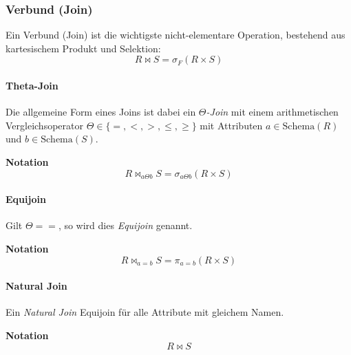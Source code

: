 \documentclass[a4paper, 11pt, accentcolor = tud3b]{tudreport}
\newcommand{\Schema}{\text{Schema}}
\begin{document}
                \subsubsection{Verbund (Join)} %
                    Ein Verbund (Join) ist die wichtigste nicht-elementare Operation, bestehend aus kartesischem Produkt und Selektion:
                    \begin{equation*}
	                    R \bowtie S = \sigma_F(R \times S)
                    \end{equation*}

                    \paragraph{Theta-Join} %
                        Die allgemeine Form eines Joins ist dabei ein \textit{\(\Theta\)-Join} mit einem arithmetischen Vergleichsoperator \( \Theta \in \{ =, <, >, \leq, \geq \} \) mit Attributen \( a \in \Schema(R) \) und \( b \in \Schema(S) \).
                        
                        \textbf{Notation}
                        \begin{equation*}
	                        R \bowtie _ { a \Theta b } S = \sigma _ { a \Theta b } (R \times S)
                        \end{equation*}

                    \paragraph{Equijoin} %
                        Gilt \( \Theta = = \), so wird dies \textit{Equijoin} genannt.
                        
                        \textbf{Notation}
                        \begin{equation*}
	                        R \bowtie _ { a = b } S = \pi _ { a = b } (R \times S)
                        \end{equation*}

                    \paragraph{Natural Join} %
                        Ein \textit{Natural Join} Equijoin für alle Attribute mit gleichem Namen.
                        
                        \textbf{Notation}
                        \begin{equation*}
	                        R \bowtie S
                        \end{equation*}
\end{document}
